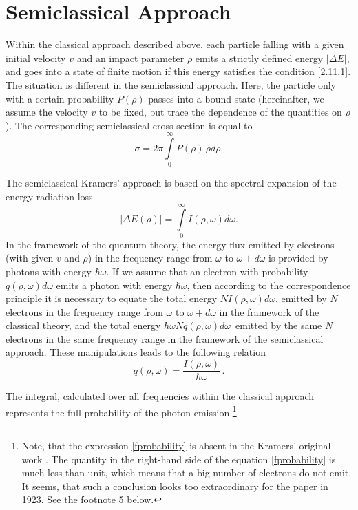\documentclass{SovJurn/JETPL}
\begin{document}
\section{Semiclassical Approach}
\par Within the classical approach described above, each particle falling with a given initial velocity $v$ and an impact parameter $\rho$ emits a strictly defined energy $|\Delta E|$, and goes into a state of finite motion if this energy satisfies the condition \eqref{2.11.1}. The situation is different in the semiclassical approach. Here, the particle only with a certain probability $P(\rho)$ passes into a bound state (hereinafter, we assume the velocity $v$ to be fixed, but trace the dependence of the quantities on $\rho$). The corresponding semiclassical cross section is equal to
\begin{equation}
\label{crosssection}
\sigma=2\pi\int\limits_{0}^{\infty}P(\rho)\,\rho d\rho.
\end{equation}
\par The semiclassical Kramers' approach is based on the spectral expansion of the energy radiation loss
\begin{equation}
\label{spectrum}
|\Delta E(\rho)|=\int\limits_{0}^{\infty}I(\rho,\omega)d\omega.
\end{equation}
In the framework of the quantum theory, the energy flux emitted by electrons (with given $v$ and $\rho$) in the frequency range from $\omega$ to $\omega+d\omega$ is provided by photons with energy $\hbar\omega$. If we assume that an electron with probability $q (\rho,\omega)d\omega$ emits a photon with energy $\hbar\omega$, then according to the correspondence principle it is necessary to equate the total energy $NI(\rho,\omega)d\omega$, emitted by $N$ electrons in the frequency range from $\omega$ to $\omega+d\omega $ in the framework of the classical theory, and the total energy $\hbar\omega Nq(\rho,\omega)d\omega\,$ emitted by the same $N$ electrons in the same frequency range in the framework of the semiclassical approach. These manipulations leads to the following relation
\begin{equation}
\label{difprobability}
q(\rho,\omega)=\frac{I(\rho,\omega)}{\hbar\omega}\,.
\end{equation}
\par The integral, calculated over all frequencies within the classical approach represents the full probability of the photon emission \footnote{Note, that the expression \eqref{fprobability} is absent in the Kramers' original work \cite{kramers1923xciii}. The quantity in the right-hand side of the equation \eqref{fprobability} is much less than unit, which means that a big number of electrons do not emit. It seems, that such a conclusion looks too extraordinary for the paper in 1923. See the footnote 5 below.}
\end{document}
